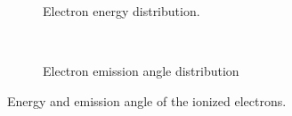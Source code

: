 \begin{figure}[!ht]
	\begin{subfigure}{0.5\textwidth}
		
		\caption{Electron energy distribution.}
		\label{}
	\end{subfigure}
	~
	\begin{subfigure}{0.5\textwidth}
		
		\caption{Electron emission angle distribution}
		\label{}
	\end{subfigure}
	\caption[Energy and emission angle of the ionized electrons]{Energy and emission angle of the ionized electrons.}
	\label{chap3:garfieldangle}
\end{figure}
